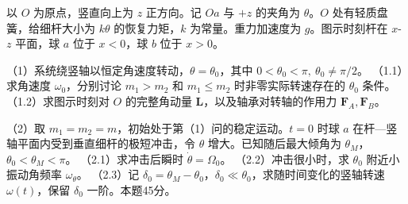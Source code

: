 \documentclass[12pt,a4paper,fontset=fandol]{ctexart}
\begin{document}
以 \(O\) 为原点，竖直向上为 \(z\) 正方向。记 \(Oa\) 与 \(+z\) 的夹角为
\(\theta\)。\(O\) 处有轻质盘簧，给细杆大小为 \(k\theta\)
的恢复力矩，\(k\) 为常量。重力加速度为 \(g\)。图示时刻杆在 \(x\)-\(z\)
平面，球 \(a\) 位于 \(x<0\)，球 \(b\) 位于 \(x>0\)。

（1）系统绕竖轴以恒定角速度转动，\(\theta=\theta_0\)，其中
\(0<\theta_0<\pi,\ \theta_0\ne\pi/2\)。 （1.1）求角速度
\(\omega_0\)，分别讨论 \(m_1>m_2\) 和 \(m_1\le m_2\)
时非零实际转速存在的 \(\theta_0\) 条件。 （1.2）求图示时刻对 \(O\)
的完整角动量 \(\mathbf L\)，以及轴承对转轴的作用力
\(\mathbf F_A,\mathbf F_B\)。

（2）取 \(m_1=m_2=m\)，初始处于第（1）问的稳定运动。\(t=0\) 时球 \(a\)
在杆---竖轴平面内受到垂直细杆的极短冲击，令 \(\theta\)
增大。已知随后最大倾角为 \(\theta_M\)，\(\theta_0<\theta_M<\pi\)。
（2.1）求冲击后瞬时 \(\dot\theta=\Omega_0\)。 （2.2）冲击很小时，求
\(\theta_0\) 附近小振动角频率 \(\omega_\theta\)。 （2.3）记
\(\delta_0=\theta_M-\theta_0\)，\(\delta_0\ll\theta_0\)，求随时间变化的竖轴转速
\(\omega(t)\)，保留 \(\delta_0\) 一阶。本题45分。

\begin{center}
\begin{minipage}{\linewidth}
\centering\begingroup
{}
\ifdim\wd\diagrambox>.88\linewidth
\sbox{\diagrambox}{\resizebox{.88\linewidth}{!}{\usebox{\diagrambox}}}
\fi
\ifdim\ht\diagrambox>.40\textheight
\resizebox{!}{.40\textheight}{\usebox{\diagrambox}}
\else\usebox{\diagrambox}\fi
\par{}
\endgroup\end{minipage}
\end{center}

\clearpage
\end{document}
